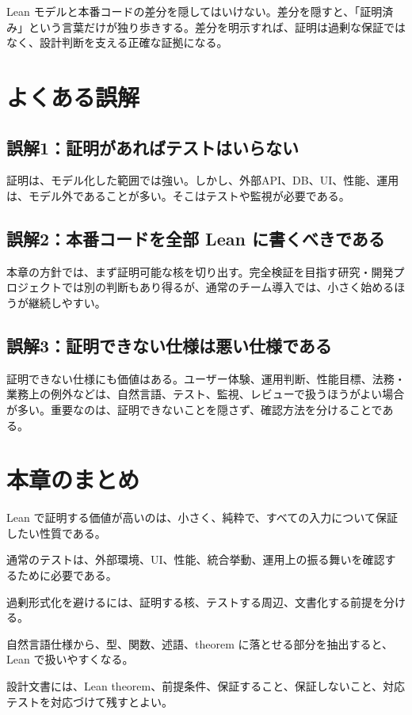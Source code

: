 \begin{warningbox}
Lean モデルと本番コードの差分を隠してはいけない。差分を隠すと、「証明済み」という言葉だけが独り歩きする。差分を明示すれば、証明は過剰な保証ではなく、設計判断を支える正確な証拠になる。
\end{warningbox}

\section{よくある誤解}

\subsection{誤解1：証明があればテストはいらない}

証明は、モデル化した範囲では強い。しかし、外部API、DB、UI、性能、運用は、モデル外であることが多い。そこはテストや監視が必要である。

\subsection{誤解2：本番コードを全部 Lean に書くべきである}

本章の方針では、まず証明可能な核を切り出す。完全検証を目指す研究・開発プロジェクトでは別の判断もあり得るが、通常のチーム導入では、小さく始めるほうが継続しやすい。

\subsection{誤解3：証明できない仕様は悪い仕様である}

証明できない仕様にも価値はある。ユーザー体験、運用判断、性能目標、法務・業務上の例外などは、自然言語、テスト、監視、レビューで扱うほうがよい場合が多い。重要なのは、証明できないことを隠さず、確認方法を分けることである。

\section{本章のまとめ}

Lean で証明する価値が高いのは、小さく、純粋で、すべての入力について保証したい性質である。

通常のテストは、外部環境、UI、性能、統合挙動、運用上の振る舞いを確認するために必要である。

過剰形式化を避けるには、証明する核、テストする周辺、文書化する前提を分ける。

自然言語仕様から、型、関数、述語、theorem に落とせる部分を抽出すると、Lean で扱いやすくなる。

設計文書には、Lean theorem、前提条件、保証すること、保証しないこと、対応テストを対応づけて残すとよい。
